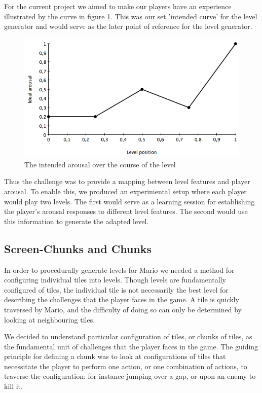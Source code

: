 \documentclass{llncs}
\begin{document}
For the current project we aimed to make our players have an experience illustrated by the curve in figure \ref{fig:ideal}.
This was our set 'intended curve' for the level generator and would serve as the later point of reference for the level generator.
\begin{figure}
\centering
\includegraphics[scale=0.4]{idealGraph.png}
\caption{The intended arousal over the course of the level}
\label{fig:ideal}
\end{figure}
Thus the challenge was to provide a mapping between level features and player arousal. To enable this, we produced an experimental setup where each player would play two levels.
The first would serve as a learning session for establishing the player's arousal responses to different level features. The second would use this information to generate the adapted level.

\subsection{Screen-Chunks and Chunks}
In order to procedurally generate levels for Mario we needed a method for configuring individual tiles into levels.%
Though levels are fundamentally configured of tiles, the individual tile is not necessarily the best level for describing the challenges that the player faces in the game. A tile is quickly traversed by Mario, and the difficulty of doing so can only be determined by looking at neighbouring tiles.

We decided to understand particular configuration of tiles, or chunks of tiles, as the fundamental unit of challenges that the player faces in the game.
The guiding principle for defining a chunk was to look at configurations of tiles that necessitate the player to perform one action, or one combination of actions, to traverse the configuration: for instance jumping over a gap, or upon an enemy to kill it.
\end{document}
